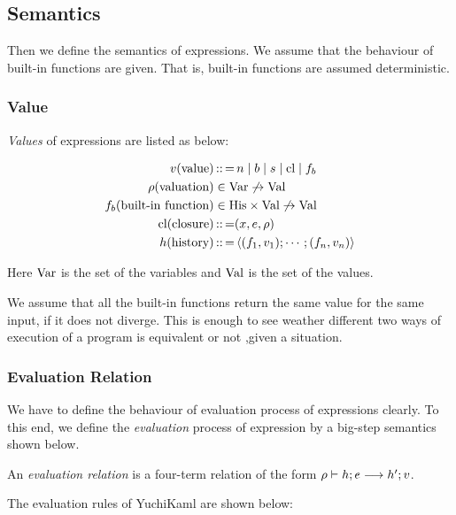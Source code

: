 
\subsection{Semantics}

Then we define the semantics of expressions.
We assume that the behaviour of built-in functions are given.
That is, built-in functions are assumed deterministic.

\subsubsection{Value}
\emph{Values} of expressions are listed as below:

\begin{align*}
    v (\text{value}) &\operatorname{:\!:=} n \mid b \mid  s \mid  \text{cl} \mid  f_b\\
    \rho  (\text{valuation}) &\in \text{Var} \not\to\text{Val} \\
    f_b{} (\text{built-in function})&\in \text{His} \times\text{Val}\not\to\text{Val}\\
    \text{cl} (\text{closure}) &\operatorname{:\!:=} (x,e,\rho{})\\
    h (\text{history}) &\operatorname{:\!:=} \left\langle (f_1, v_1); \cdots; (f_n, v_n) \right\rangle
\end{align*}



Here $\text{Var}$ is the set of the variables and $\text{Val}$ is the set of the values.

\begin{note}
We assume that all the built-in functions return the same value for the same input, if it does not diverge.
This is enough to see weather different two ways of execution of a program is equivalent or not ,given a situation.
\end{note}

\subsubsection{Evaluation Relation}
\label{sec: Evaluation Realation}

We have to define the behaviour of evaluation process of expressions clearly.
To this end, we define the \emph{evaluation} process of expression by a big-step semantics shown below.

An \emph{evaluation relation} is a four-term relation of the form $\rho \vdash h; e \longrightarrow h'; v$.

The evaluation rules of YuchiKaml are shown below:

